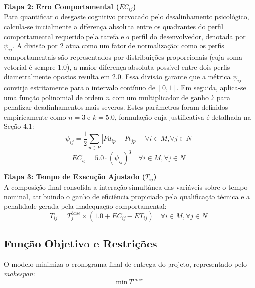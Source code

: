\documentclass[a4paper,11pt]{article}
\begin{document}
\vspace{0.2cm}
\noindent\textbf{Etapa 2: Erro Comportamental ($EC_{ij}$)} \\
Para quantificar o desgaste cognitivo provocado pelo desalinhamento psicológico, 
calcula-se inicialmente a diferença absoluta entre os quadrantes do perfil comportamental
requerido pela tarefa e o perfil do desenvolvedor, denotada 
por $\psi_{ij}$. A divisão por $2$ atua como um fator de normalização: como os perfis 
comportamentais são representados por distribuições proporcionais (cuja soma 
vetorial é sempre $1.0$), a maior diferença absoluta possível entre dois perfis 
diametralmente opostos resulta em $2.0$. Essa divisão garante que a métrica 
$\psi_{ij}$ convirja estritamente para o intervalo contínuo de $[0, 1]$. Em 
seguida, aplica-se uma função polinomial de ordem $n$ com um multiplicador de 
ganho $k$ para penalizar desalinhamentos mais severos. Estes parâmetros foram 
definidos empiricamente como $n=3$ e $k=5.0$, formulação cuja justificativa é
detalhada na Seção 4.1:
\begin{equation}
    \psi_{ij} = \frac{1}{2} \sum_{p \in P} |Pd_{ip} - Pt_{jp}| \quad \forall i \in M, \forall j \in N
\end{equation}
\begin{equation}
    EC_{ij} = 5.0 \cdot (\psi_{ij})^3 \quad \forall i \in M, \forall j \in N
\end{equation}

\vspace{0.2cm}
\noindent\textbf{Etapa 3: Tempo de Execução Ajustado ($T_{ij}$)} \\
A composição final consolida a interação simultânea das variáveis sobre o 
tempo nominal, atribuindo o ganho de eficiência propiciado pela 
qualificação técnica e a penalidade gerada pela inadequação comportamental:
\begin{equation}
    T_{ij} = T^{base}_j \times (1.0 + EC_{ij} - ET_{ij}) \quad \forall i \in M, \forall j \in N
\end{equation}

\subsection{Função Objetivo e Restrições}

O modelo minimiza o cronograma final de entrega do projeto, representado pelo
\textit{makespan}:
\begin{equation}
    \min T^{max}
\end{equation}
\end{document}
